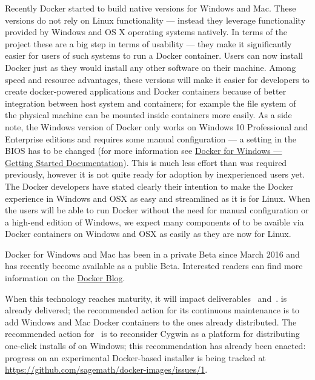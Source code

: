 \documentclass{deliverablereport}
\begin{document}
Recently Docker started to build native versions for Windows and
Mac. These versions do not rely on Linux functionality --- instead they
leverage functionality provided by Windows and OS X operating systems
natively. In terms of the \ODK project these are a big step in terms
of usability --- they make it significantly easier for users of such systems to run a
Docker container. Users can now install Docker just as they would
install any other software on their machine. Among speed and resource
advantages, these versions will make it easier for developers to
create docker-powered applications and Docker containers because of
better integration between host system and containers; for example the
file system of the physical machine can be mounted inside containers
more easily. As a side note, the Windows version of Docker only works
on Windows 10 Professional and Enterprise editions and requires some
manual configuration --- a setting in the BIOS has to be changed (for
more information see
\href{https://docs.docker.com/docker-for-windows/#/what-to-know-before-you-install}{Docker
  for Windows --- Getting Started Documentation}). This is much less
effort than was required previously, however it is not quite ready for
adoption by inexperienced users yet. The Docker developers have stated
clearly their intention to make the Docker experience in Windows and
OSX as easy and streamlined as it is for Linux. When the users will be
able to run Docker without the need for manual configuration or a
high-end edition of Windows, we expect many components of \ODK to be
avaible via Docker containers on Windows and OSX as easily as they are
now for Linux.

Docker for Windows and Mac has been in a private Beta since March 2016
and has recently become available as a public Beta. Interested
readers can find more information on the
\href{https://blog.docker.com/2016/06/docker-mac-windows-public-beta/}{Docker
  Blog}.

When this technology reaches maturity, it will impact
deliverables~
and~.
 is already
delivered; the recommended action for its continuous maintenance is to
add Windows and Mac Docker containers to the ones already
distributed. The recommended action
for~ is to
reconsider Cygwin as a platform for distributing one-click installs of
\Sage on Windows; this recommendation has already been enacted:
progress on an experimental Docker-based installer is being tracked at
\url{https://github.com/sagemath/docker-images/issues/1}.
\end{document}
